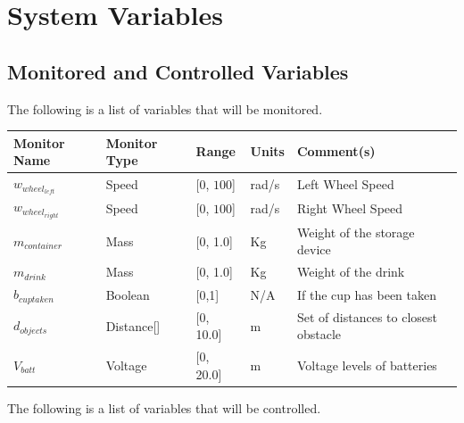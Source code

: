 \documentclass [10pt]{article}
\begin{document}

\section{System Variables}


\subsection{Monitored and Controlled Variables}
The following is a list of variables that will be monitored. \\

\begin{longtable}{|l|l|l|l|l|}\hline 
	\rowcolor{tableCell}\textbf{Monitor Name} & \textbf{Monitor Type} & \textbf{Range} & \textbf{Units} & \textbf{Comment(s)} \\ \hline
	$ w_{wheel_{left}} $ & Speed & [0, $ 100 $]& rad/s &  Left Wheel Speed\\ \hline
	\rowcolor{tableCell}$ w_{wheel_{right}} $ & Speed & [0, $ 100 $]& rad/s & Right Wheel Speed \\ \hline
	$ m_{container} $ & Mass & [0, 1.0]& Kg &  Weight of the storage device  \\ \hline
	\rowcolor{tableCell}$ m_{drink} $    & Mass & [0, 1.0] & Kg &  Weight of the drink  \\ \hline
	$ b_{cuptaken } $ & Boolean & [0,1] & N/A & If the cup has been taken \\ \hline
	\rowcolor{tableCell}$  d_{objects} $ & Distance[] & [0, 10.0]& m & Set of distances to closest obstacle \\ \hline
	$  V_{batt} $ & Voltage & [0, 20.0]& m &  Voltage levels of batteries \\ \hline
\end{longtable}


The following is a list of variables that will be controlled. \\
\end{document}
